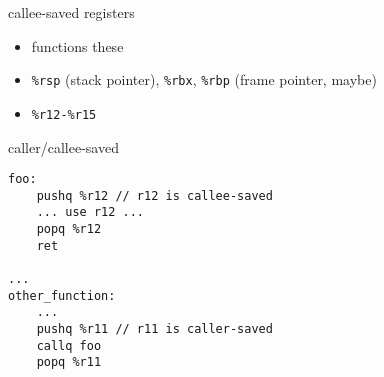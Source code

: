 \begin{frame}[fragile,label=calleeSaved]{callee-saved registers}
    \begin{itemize}
    \item functions  these
    \vspace{.5cm}
    \item {\tt \%rsp} (stack pointer), {\tt \%rbx}, {\tt \%rbp} (frame pointer, maybe)
    \item {\tt \%r12-\%r15}
    \end{itemize}
\end{frame}

\begin{frame}[fragile,label=callerCallee]{caller/callee-saved}
\lstset{style=small}
\begin{lstlisting}
foo:
    pushq %r12 // r12 is callee-saved
    ... use r12 ...
    popq %r12
    ret

...
other_function:
    ...
    pushq %r11 // r11 is caller-saved
    callq foo
    popq %r11
\end{lstlisting}
\end{frame}

